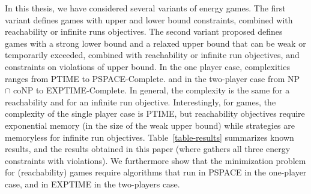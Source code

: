 In this thesis, we have considered several variants of energy games. The first variant defines games with upper and lower bound constraints, combined with reachability or infinite runs objectives. 
The second variant proposed defines games with a strong lower bound and a relaxed upper bound that can be weak or temporarily exceeded, combined with reachability or infinite run objectives, and constraints on violations of upper bound. 
\vskip 0.3cm
In the one player case, complexities ranges from PTIME to PSPACE-Complete. and in the two-player case from NP $\cap$ coNP to EXPTIME-Complete. 
In general, the complexity is the same for a reachability and for an infinite run objective. Interestingly, for \LWenergy games, the complexity of the single player case is PTIME, but reachability objectives require exponential memory (in the size of the weak upper bound) while strategies are memoryless for infinite run objectives.
\vskip 0.3cm
Table~\ref{table-results} summarizes known
results, and the results obtained in this paper (where \LVenergyall
gathers all three energy constraints with violations). We furthermore show that the minimization problem for \LVenergyall (reachability) games require algorithms that run in PSPACE in the one-player case, and in EXPTIME in the two-players case.


